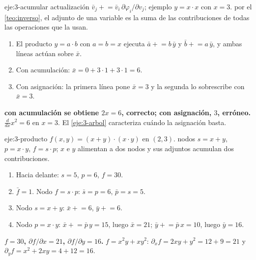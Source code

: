 \begin{solucion}{eje:3-acumular}
\datos actualización $\bar v_j\mathrel{+}=\bar v_i\,\partial\varphi_i/\partial v_j$; ejemplo $y=x\cdot x$ con $x=3$.
\planteamiento por el \cref{teo:inverso}, el adjunto de una variable es la suma de las contribuciones de todas las operaciones que la usan.
\pasos
\begin{enumerate}[label=\arabic*.]
  \item El producto $y=a\cdot b$ con $a=b=x$ ejecuta $\bar a\mathrel{+}=b\,\bar y$ y $\bar b\mathrel{+}=a\,\bar y$, y ambas líneas actúan sobre $\bar x$.
  \item Con acumulación: $\bar x=0+3\cdot 1+3\cdot 1=6$.
  \item Con asignación: la primera línea pone $\bar x=3$ y la segunda lo sobrescribe con $\bar x=3$.
\end{enumerate}
\resultado \textbf{con acumulación se obtiene $2x=6$, correcto; con asignación, $3$, erróneo.}
\comprobacion $\frac{d}{dx}x^{2}=6$ en $x=3$. El \cref{eje:3-arbol} caracteriza cuándo la asignación basta.
\end{solucion}

\begin{solucion}{eje:3-producto}
\datos $f(x,y)=(x+y)\cdot(x\cdot y)$ en $(2,3)$.
\planteamiento nodos $s=x+y$, $p=x\cdot y$, $f=s\cdot p$; $x$ e $y$ alimentan a dos nodos y sus adjuntos acumulan dos contribuciones.
\pasos
\begin{enumerate}[label=\arabic*.]
  \item Hacia delante: $s=5$, $p=6$, $f=30$.
  \item $\bar f=1$. Nodo $f=s\cdot p$: $\bar s=p=6$, $\bar p=s=5$.
  \item Nodo $s=x+y$: $\bar x\mathrel{+}=6$, $\bar y\mathrel{+}=6$.
  \item Nodo $p=x\cdot y$: $\bar x\mathrel{+}=\bar p\,y=15$, luego $\bar x=21$; $\bar y\mathrel{+}=\bar p\,x=10$, luego $\bar y=16$.
\end{enumerate}
\resultado \textbf{$f=30$, $\partial f/\partial x=21$, $\partial f/\partial y=16$.}
\comprobacion $f=x^{2}y+xy^{2}$: $\partial_xf=2xy+y^{2}=12+9=21$ y $\partial_yf=x^{2}+2xy=4+12=16$.
\end{solucion}

